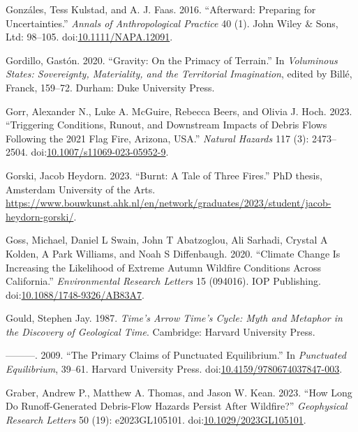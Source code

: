 \documentclass[
]{article}
\newlength{\cslhangindent}
\newenvironment{CSLReferences}[2] %
 {\begin{list}{}{%
  \setlength{\itemindent}{0pt}
  \setlength{\leftmargin}{0pt}
  \setlength{\parsep}{0pt}
  \ifodd #1
   \setlength{\leftmargin}{\cslhangindent}
   \setlength{\itemindent}{-1\cslhangindent}
  \fi
  \setlength{\itemsep}{#2\baselineskip}}}
 {\end{list}}
\begin{document}
\begin{CSLReferences}{1}{0}
Gonzáles, Tess Kulstad, and A. J. Faas. 2016. {``Afterward: {Preparing} for Uncertainties.''} \emph{Annals of Anthropological Practice} 40 (1). John Wiley \& Sons, Ltd: 98--105. doi:\href{https://doi.org/10.1111/NAPA.12091}{10.1111/NAPA.12091}.

Gordillo, Gastón. 2020. {``Gravity: {On} the {Primacy} of {Terrain}.''} In \emph{Voluminous {States}: {Sovereignty}, {Materiality}, and the {Territorial Imagination}}, edited by Billé, Franck, 159--72. Durham: Duke University Press.

Gorr, Alexander N., Luke A. McGuire, Rebecca Beers, and Olivia J. Hoch. 2023. {``Triggering Conditions, Runout, and Downstream Impacts of Debris Flows Following the 2021 {Flag Fire}, {Arizona}, {USA}.''} \emph{Natural Hazards} 117 (3): 2473--2504. doi:\href{https://doi.org/10.1007/s11069-023-05952-9}{10.1007/s11069-023-05952-9}.

Gorski, Jacob Heydorn. 2023. {``Burnt: {A Tale} of {Three Fires}.''} PhD thesis, Amsterdam University of the Arts. \url{https://www.bouwkunst.ahk.nl/en/network/graduates/2023/student/jacob-heydorn-gorski/}.

Goss, Michael, Daniel L Swain, John T Abatzoglou, Ali Sarhadi, Crystal A Kolden, A Park Williams, and Noah S Diffenbaugh. 2020. {``Climate Change Is Increasing the Likelihood of Extreme Autumn Wildfire Conditions Across {California}.''} \emph{Environmental Research Letters} 15 (094016). IOP Publishing. doi:\href{https://doi.org/10.1088/1748-9326/AB83A7}{10.1088/1748-9326/AB83A7}.

Gould, Stephen Jay. 1987. \emph{Time's {Arrow Time}'s {Cycle}: {Myth} and {Metaphor} in the {Discovery} of {Geological Time}}. Cambridge: Harvard University Press.

---------. 2009. {``The {Primary Claims} of {Punctuated Equilibrium}.''} In \emph{Punctuated {Equilibrium}}, 39--61. Harvard University Press. doi:\href{https://doi.org/10.4159/9780674037847-003}{10.4159/9780674037847-003}.

Graber, Andrew P., Matthew A. Thomas, and Jason W. Kean. 2023. {``How {Long Do Runoff-Generated Debris-Flow Hazards Persist After Wildfire}?''} \emph{Geophysical Research Letters} 50 (19): e2023GL105101. doi:\href{https://doi.org/10.1029/2023GL105101}{10.1029/2023GL105101}.


\end{CSLReferences}
\end{document}
